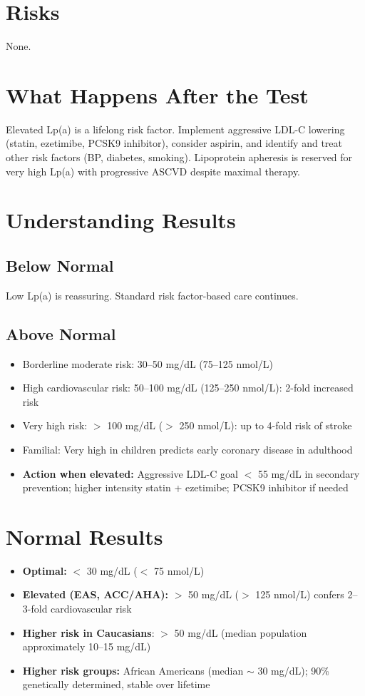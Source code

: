 \section*{Risks}
None.

\section*{What Happens After the Test}
Elevated Lp(a) is a lifelong risk factor. Implement aggressive LDL-C lowering (statin, ezetimibe, PCSK9 inhibitor), consider aspirin, and identify and treat other risk factors (BP, diabetes, smoking). Lipoprotein apheresis is reserved for very high Lp(a) with progressive ASCVD despite maximal therapy.

\section*{Understanding Results}

\subsection*{Below Normal}
Low Lp(a) is reassuring. Standard risk factor-based care continues.

\subsection*{Above Normal}
\begin{itemize}
  \item Borderline moderate risk: 30--50 mg/dL (75--125 nmol/L)
  \item High cardiovascular risk: 50--100 mg/dL (125--250 nmol/L): 2-fold increased risk
  \item Very high risk: $>$ 100 mg/dL ($>$ 250 nmol/L): up to 4-fold risk of stroke
  \item Familial: Very high in children predicts early coronary disease in adulthood
  \item \textbf{Action when elevated:} Aggressive LDL-C goal $<$ 55 mg/dL in secondary prevention; higher intensity statin + ezetimibe; PCSK9 inhibitor if needed
\end{itemize}

\section*{Normal Results}
\begin{itemize}
  \item \textbf{Optimal:} $<$ 30 mg/dL ($<$ 75 nmol/L)
  \item \textbf{Elevated (EAS, ACC/AHA):} $>$ 50 mg/dL ($>$ 125 nmol/L) confers 2--3-fold cardiovascular risk \cite{mach2020esc}
  \item \textbf{Higher risk in Caucasians}: $>$ 50 mg/dL (median population approximately 10--15 mg/dL)
  \item \textbf{Higher risk groups:} African Americans (median $\sim$ 30 mg/dL); 90\% genetically determined, stable over lifetime
\end{itemize}

